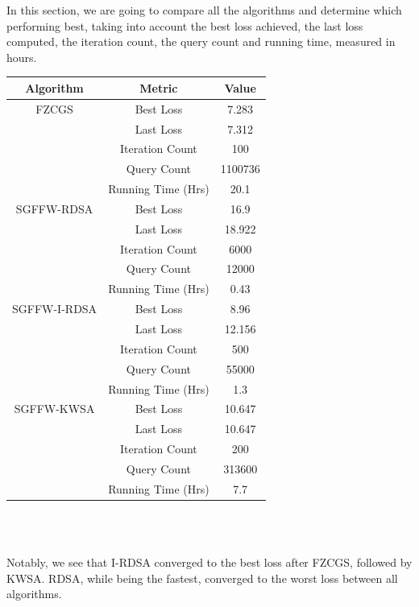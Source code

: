 \documentclass[10pt,twocolumn,letterpaper]{article}
\begin{document}
In this section, we are going to compare all the algorithms and determine which performing best,
taking into account the best loss achieved, the last loss computed, 
the iteration count, the query count and running time, measured in hours.

\begin{center}
   \begin{tabular}{ccc}
       \hline
       \textbf{Algorithm} & \textbf{Metric} & \textbf{Value} \\
       \hline
       FZCGS & Best Loss & 7.283\\
            & Last Loss & 7.312\\
            & Iteration Count & 100\\
            & Query Count & 1100736\\
            & Running Time (Hrs) & 20.1\\
       \hline
       SGFFW-RDSA & Best Loss & 16.9\\
                  & Last Loss & 18.922\\
                  & Iteration Count & 6000\\
                  & Query Count & 12000\\
                  & Running Time (Hrs) & 0.43\\
       \hline
       SGFFW-I-RDSA & Best Loss & 8.96 \\
                    & Last Loss & 12.156\\
                    & Iteration Count & 500\\
                    & Query Count & 55000\\
                    & Running Time (Hrs) & 1.3\\
       \hline
       SGFFW-KWSA & Best Loss & 10.647\\
                  & Last Loss & 10.647\\
                  & Iteration Count & 200\\
                  & Query Count & 313600\\
                  & Running Time (Hrs) & 7.7\\
       \hline
   \end{tabular}\\
   \
\end{center}


Notably, we see that I-RDSA converged to the best loss after FZCGS, followed by KWSA.
RDSA, while being the fastest, converged to the worst loss between all algorithms.
\end{document}
